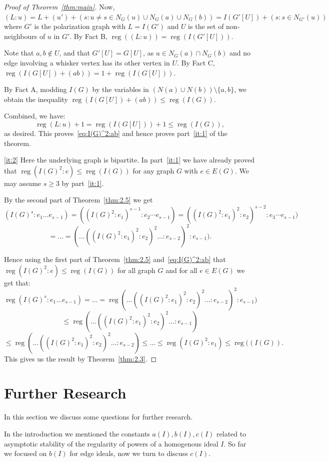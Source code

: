 \documentclass[10pt]{article}
\theoremstyle{definition}
\numberwithin{equation}{section}
\newcommand \reg{\operatorname{reg}}
\begin{document}
\begin{proof}[Proof of Theorem~\ref{thm:main}]
Now, $(L:u)=L+(u')+(s: u\neq s\in N_G(u)\cup N_G(a)\cup N_G(b))=I(G'[U])+(s: s\in N_{G'}(u))$ where $G'$ is the polarization graph with $L=I(G')$ and $U$ is the set of non-neighbours of $u$ in $G'$.
By Fact B, $\reg((L:u))=\reg(I(G'[U]))$.

Note that  $a,b\notin
U$, and that $G'[U]=G[U]$, as $u\in N_G(a)\cap N_G(b)$ and no edge involving a whisker vertex has its other vertex in $U$.
By Fact C,
$\reg(I(G[U])+(ab))=1+\reg(I(G[U]))$.

By Fact A, modding $I(G)$ by the variables in $(N(a)\cup N(b))\setminus \{a,b\}$, we obtain the inequality $\reg(I(G[U])+(ab))\leq \reg(I(G))$.
    
Combined, we have: $$\reg(L:u)+1=\reg(I(G[U]))+1\leq \reg(I(G)), $$
as desired. 
This proves~\eqref{eq:I(G)^2:ab} and hence proves part~\ref{it:1} of the theorem.

\ref{it:2} Here the underlying graph is bipartite. In part~\ref{it:1} we have already proved that $\reg(I(G)^2:e)\leq \reg(I(G))$ for any graph $G$ with $e \in E(G)$. We may assume $s \geq 3$ by part~\ref{it:1}.


By the second part of Theorem~\ref{thm:2.5} we get
$$ (I(G)^s:e_1\ldots e_{s-1}) =  ((I(G)^2:e_1)^{s-1}: e_2 \cdots e_{s-1})=  ((I(G)^2:e_1)^2 : e_2)^{s-2}: e_3 \cdots e_{s-1})$$
$$ = \ldots  =(\ldots((I(G)^2:e_1)^2 : e_2)^2 \ldots : e_{s-2})^2 : e_{s-1}).$$

Hence using the first part of Theorem~\ref{thm:2.5} and~\eqref{eq:I(G)^2:ab} that $\reg(I(G)^2:e)\leq \reg(I(G))$ for all graph $G$ and for all $e \in E(G)$ we get that:
$$ \reg(I(G)^s:e_1\ldots e_{s-1}) =
\ldots =
\reg (\ldots((I(G)^2:e_1)^2 : e_2)^2 \ldots : e_{s-2})^2 : e_{s-1})$$
$$\leq \reg  (\ldots((I(G)^2:e_1)^2 : e_2)^2 \ldots : e_{s-1})$$
$$\leq \reg  (\ldots((I(G)^2:e_1)^2 : e_2)^2 \ldots : e_{s-2})\leq \ldots \leq \reg (I(G)^2:e_1)\leq \reg((I(G)).$$
This gives us the result by Theorem~\ref{thm:2.3}.
\end{proof}

\section{Further Research}\label{sec:further}
 In this section we discuss some questions for further research.
 
In the introduction we mentioned the constants $a(I), b(I), c(I)$ related to
asymptotic stability of the regularity of powers of a homogenous ideal $I$. So far we focused on $b(I)$ for edge ideals, now we turn to discuss $c(I)$.
\end{document}
